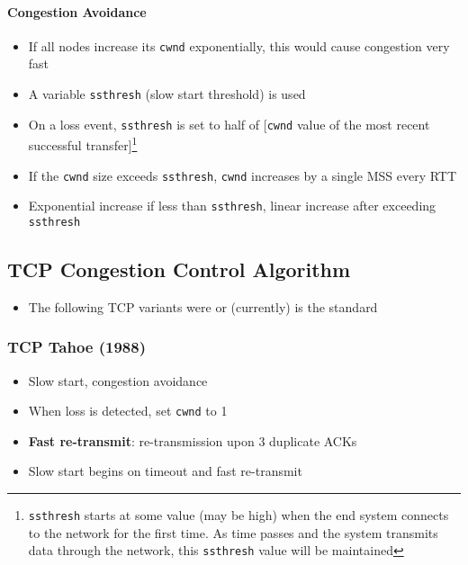 \paragraph{Congestion Avoidance}
\begin{itemize}
	\item If all nodes increase its \texttt{cwnd} exponentially, this would cause congestion very fast
	\item A variable \texttt{ssthresh} (slow start threshold) is used
	\item On a loss event, \texttt{ssthresh} is set to half of [\texttt{cwnd} value of the most recent successful transfer]\footnote{\texttt{ssthresh} starts at some value (may be high) when the end system connects to the network for the first time. As time passes and the system transmits data through the network, this \texttt{ssthresh} value will be maintained}
	\item If the \texttt{cwnd} size exceeds \texttt{ssthresh}, \texttt{cwnd} increases by a single MSS every RTT
	\item Exponential increase if less than \texttt{ssthresh}, linear increase after exceeding \texttt{ssthresh}
\end{itemize}

\subsection{TCP Congestion Control Algorithm}
\begin{itemize}
	\item The following TCP variants were or (currently) is the standard
\end{itemize}

\subsubsection{TCP Tahoe (1988)}
\begin{itemize}
	\item Slow start, congestion avoidance
	\item When loss is detected, set \texttt{cwnd} to 1
	\item \textbf{Fast re-transmit}: re-transmission upon 3 duplicate ACKs 
	\item Slow start begins on timeout and fast re-transmit
\end{itemize}

